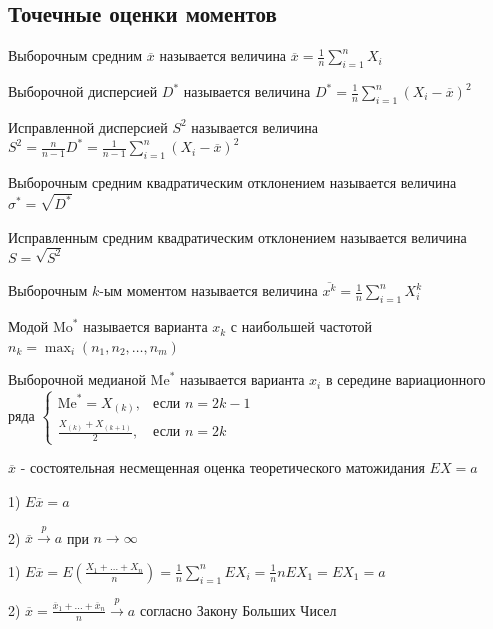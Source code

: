 \documentclass[12pt]{article}
\begin{document}
\subsection{Точечные оценки моментов}

\hypertarget{moments_point_estimation}{}

\Def Выборочным средним $\overline{x}$ называется величина $\overline{x} = \frac{1}{n} \sum_{i = 1}^n X_i$

\Defs Выборочной дисперсией $D^*$ называется величина $D^* = \frac{1}{n} \sum_{i = 1}^n (X_i - \overline{x})^2$

\Defs Исправленной дисперсией $S^2$ называется величина $S^2 = \frac{n}{n - 1} D^* = \frac{1}{n - 1} \sum_{i = 1}^n (X_i - \overline{x})^2$

\Defs Выборочным средним квадратическим отклонением называется величина $\sigma^* = \sqrt{D^*}$

\Defs Исправленным средним квадратическим отклонением называется величина $S = \sqrt{S^2}$

\Defs Выборочным $k$-ым моментом называется величина $\overline{x^k} = \frac{1}{n} \sum_{i = 1}^n X_i^k$

\Defs Модой $\mathrm{Mo}^*$ называется варианта $x_k$ с наибольшей частотой $n_k = \max_i (n_1, n_2, \dots, n_m)$

\Defs Выборочной медианой $\mathrm{Me}^*$ называется варианта $x_i$ в середине вариационного ряда $\begin{cases}\mathrm{Me}^* = 
X_{(k)}, & \text{если } n = 2k - 1 \\ \frac{X_{(k)} + X_{(k + 1)}}{2}, & \text{если } n = 2k\end{cases}$

\begin{MyTheorem}
    \Ths $\overline{x}$ - состоятельная несмещенная оценка теоретического матожидания $EX = a$

    1) $E \overline{x} = a$

    2) $\overline{x} \overset{p}{\longrightarrow} a$ при $n \to \infty$
\end{MyTheorem}

\begin{MyProof}
    1) $E \overline{x} = E\left(\frac{X_1 + \dots + X_n}{n}\right) = \frac{1}{n} \sum_{i = 1}^n E X_i = 
    \frac{1}{n} n E X_1 = E X_1 = a$

    2) $\overline{x} = \frac{\overline{x}_1 + \dots + \overline{x}_n}{n} \overset{p}{\longrightarrow} a$ 
    согласно Закону Больших Чисел
\end{MyProof}
\end{document}
